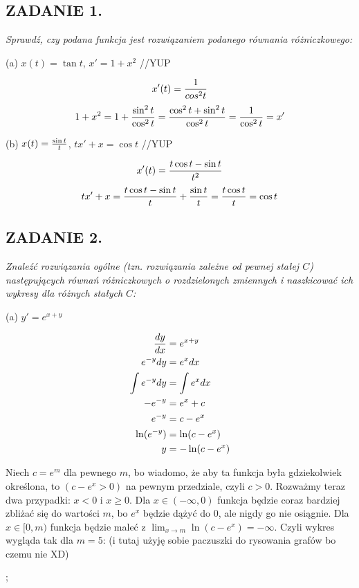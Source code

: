 \documentclass{article}
\begin{document}
\subsection*{ZADANIE 1.}
\emph{Sprawdź, czy podana funkcja jest rozwiązaniem podanego równania różniczkowego:}
\smallskip

{\color{dark-green}(a) $x(t)=\tan t$, $x'=1+x^2$} //YUP

$$x'(t)={1\over cos^2t}$$
$$1+x^2=1+{\sin^2t\over \cos^2t}={\cos^2t+\sin^2t\over\cos^2t}={1\over\cos^2t}=x'$$

{\color{dark-green}(b) $x(t)={\sin t\over t}$, $tx'+x=\cos t$} //YUP

$$x'(t)={t\cos t-\sin t\over t^2}$$
$$tx'+x={t\cos t-\sin t\over t}+{\sin t\over t}={t\cos t\over t}=\cos t$$

\subsection*{ZADANIE 2.}
\emph{Znaleźć rozwiązania ogólne (tzn. rozwiązania zależne od pewnej stałej $C$) następujących równań różniczkowych o rozdzielonych zmiennych i naszkicować ich wykresy dla różnych stałych $C$:}
\smallskip

{\color{dark-green}(a) $y'=e^{x+y}$}

\begin{align*}
    {dy\over dx}&=e^{x+y}\\
    e^{-y}dy&=e^xdx\\
    \int e^{-y}dy&=\int e^xdx\\
    -e^{-y}&=e^x+c\\
    e^{-y}&=c-e^x\\
    \ln(e^{-y})&=\ln(c-e^x)\\
    y&=-\ln(c-e^x)
\end{align*}

Niech $c=e^m$ dla pewnego $m$, bo wiadomo, że aby ta funkcja była gdziekolwiek określona, to $(c-e^x>0)$ na pewnym przedziale, czyli $c>0$. Rozważmy teraz dwa przypadki: $x<0$ i $x\geq 0$. Dla $x\in(-\infty, 0)$ funkcja będzie coraz bardziej zbliżać się do wartości $m$, bo $e^x$ będzie dążyć do $0$, ale nigdy go nie osiągnie. Dla $x\in [0, m)$ funkcja będzie maleć z $\lim_{x\to m}\ln(c-e^x)=-\infty$. Czyli wykres wygląda tak dla $m=5$: (i tutaj użyję sobie paczuszki do rysowania grafów bo czemu nie XD)

\begin{illustration}
    \begin{my-axis}
        ;
    \end{my-axis}
\end{illustration}
\end{document}
